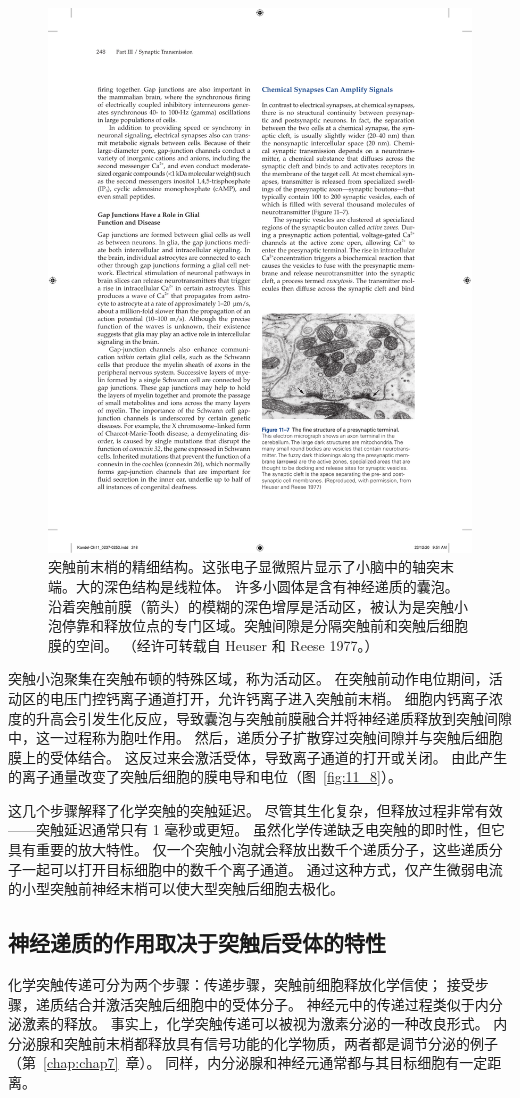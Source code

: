 \begin{figure}[htbp]
	\centering
	\includegraphics[width=0.5\linewidth]{chap11/fig_11_7}
	\caption{突触前末梢的精细结构。这张电子显微照片显示了小脑中的轴突末端。大的深色结构是线粒体。 许多小圆体是含有神经递质的囊泡。沿着突触前膜（箭头）的模糊的深色增厚是活动区，被认为是突触小泡停靠和释放位点的专门区域。突触间隙是分隔突触前和突触后细胞膜的空间。 （经许可转载自 Heuser 和 Reese 1977。）}
	\label{fig:11_7}
\end{figure}


突触小泡聚集在突触布顿的特殊区域，称为活动区。
在突触前动作电位期间，活动区的电压门控钙离子通道打开，允许钙离子进入突触前末梢。
细胞内钙离子浓度的升高会引发生化反应，导致囊泡与突触前膜融合并将神经递质释放到突触间隙中，这一过程称为胞吐作用。
然后，递质分子扩散穿过突触间隙并与突触后细胞膜上的受体结合。
这反过来会激活受体，导致离子通道的打开或关闭。
由此产生的离子通量改变了突触后细胞的膜电导和电位（图~\ref{fig:11_8}）。


这几个步骤解释了化学突触的突触延迟。
尽管其生化复杂，但释放过程非常有效——突触延迟通常只有 1 毫秒或更短。
虽然化学传递缺乏电突触的即时性，但它具有重要的放大特性。
仅一个突触小泡就会释放出数千个递质分子，这些递质分子一起可以打开目标细胞中的数千个离子通道。
通过这种方式，仅产生微弱电流的小型突触前神经末梢可以使大型突触后细胞去极化。



\subsection{神经递质的作用取决于突触后受体的特性}

化学突触传递可分为两个步骤：传递步骤，突触前细胞释放化学信使；
接受步骤，递质结合并激活突触后细胞中的受体分子。
神经元中的传递过程类似于内分泌激素的释放。
事实上，化学突触传递可以被视为激素分泌的一种改良形式。
内分泌腺和突触前末梢都释放具有信号功能的化学物质，两者都是调节分泌的例子（第~\ref{chap:chap7}~章）。
同样，内分泌腺和神经元通常都与其目标细胞有一定距离。


